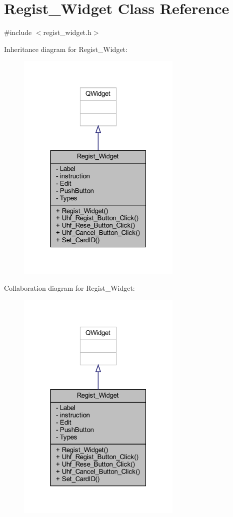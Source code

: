 \hypertarget{class_regist___widget}{}\section{Regist\+\_\+\+Widget Class Reference}
\label{class_regist___widget}


{\ttfamily \#include $<$regist\+\_\+widget.\+h$>$}



Inheritance diagram for Regist\+\_\+\+Widget\+:
\nopagebreak
\begin{figure}[H]
\begin{center}
\leavevmode
\includegraphics[width=223pt]{class_regist___widget__inherit__graph}
\end{center}
\end{figure}


Collaboration diagram for Regist\+\_\+\+Widget\+:
\nopagebreak
\begin{figure}[H]
\begin{center}
\leavevmode
\includegraphics[width=223pt]{class_regist___widget__coll__graph}
\end{center}
\end{figure}
